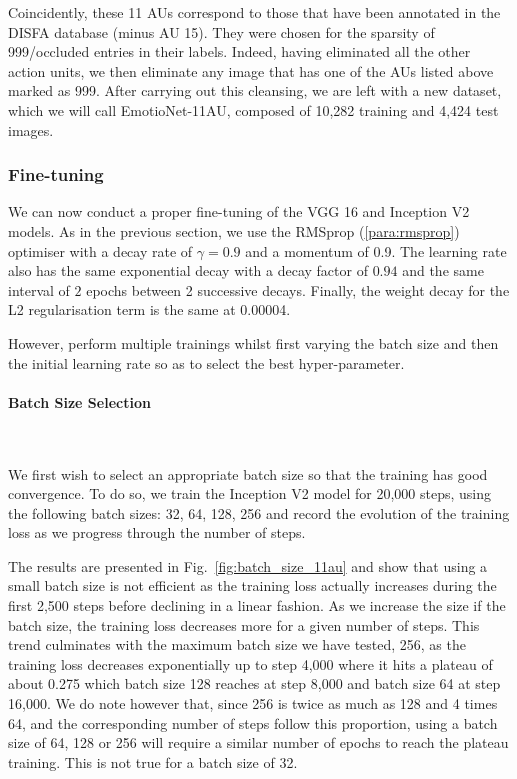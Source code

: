 \documentclass[12pt,twoside]{article}
\newcommand{\para}[1]{\paragraph{#1}\mbox{}\\}
\begin{document}
Coincidently, these 11 AUs correspond to those that have been annotated in the
DISFA database (minus AU 15). They were chosen for the sparsity of 999/occluded
entries in their labels. Indeed, having eliminated all the other action units,
we then eliminate any image that has one of the AUs listed above marked as 999.
After carrying out this cleansing, we are left with a new dataset, which we
will call EmotioNet-11AU, composed of 10,282 training and 4,424 test images.

\subsubsection{Fine-tuning}

We can now conduct a proper fine-tuning of the VGG 16 and Inception V2 models.
As in the previous section, we use the RMSprop (\ref{para:rmsprop}) optimiser
with a decay rate of $\gamma=0.9$ and a momentum of 0.9. The learning rate also
has the same exponential decay with a decay factor of $0.94$ and the same
interval of $2$ epochs between 2 successive decays. Finally, the weight decay
for the L2 regularisation term is the same at 0.00004.

However, perform multiple trainings whilst first varying the batch size and
then the initial learning rate so as to select the best hyper-parameter.

\para{Batch Size Selection}\label{para:batch_size_au11}

We first wish to select an appropriate batch size so that the training
has good convergence. To do so, we train the Inception V2 model for 20,000
steps, using the following batch sizes: 32, 64, 128, 256 and record the
evolution of the training loss as we progress through the number of steps. 

The results are presented in Fig.~\ref{fig:batch_size_11au} and show that using
a small batch size is not efficient as the training loss actually increases
during the first 2,500 steps before declining in a linear fashion. As we
increase the size if the batch size, the training loss decreases more for a
given number of steps. This trend culminates with the maximum batch size we
have tested, 256, as the training loss decreases exponentially up to step 4,000
where it hits a plateau of about 0.275 which batch size 128 reaches at step
8,000 and batch size 64 at step 16,000. We do note however that, since 256 is
twice as much as 128 and 4 times 64, and the corresponding number of steps
follow this proportion, using a batch size of 64, 128 or 256 will require a
similar number of epochs to reach the plateau training. 
This is not true for a batch size of 32. 
\end{document}

